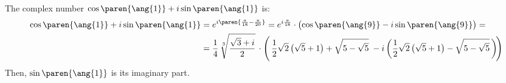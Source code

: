 The complex number $\cos\paren{\ang{1}} + i \sin\paren{\ang{1}}$ is:
\begin{align*}
 \cos\paren{\ang{1}} + i \sin\paren{\ang{1}}
 &= e^{i \paren{\frac{\pi}{18} - \frac{\pi}{20}}}
  = e^{i \frac{\pi}{18}}
    \cdot \big( \! \cos\paren{\ang{9}} - i \sin\paren{\ang{9}} \big) = \\
 &= \frac{1}{4} \, \sqrt[3]{\frac{\sqrt{3} + i}{2}}
    \, \cdot
    \Bigg( \,
      \frac{1}{2} \sqrt{2} \, \big(\sqrt{5} + 1 \big)
      + \sqrt{5 - \sqrt{5}}
      \; - i \, \bigg(
      \frac{1}{2} \sqrt{2} \, \big(\sqrt{5} + 1 \big)
      - \sqrt{5 - \sqrt{5}} \,
      \bigg) \!
   \Bigg)
\end{align*}
Then, $\sin\paren{\ang{1}}$ is its imaginary part.
